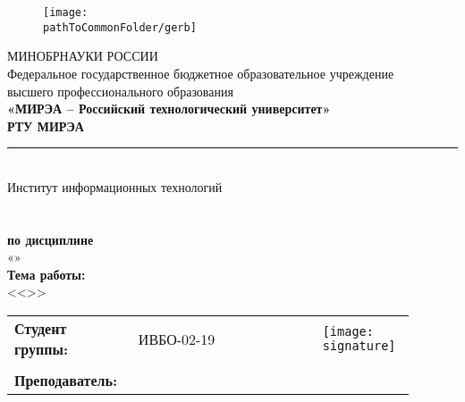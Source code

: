 
\begin{center}
	\begin{figure}[h!]
		\begin{center}
		\texttt{[image: \\pathToCommonFolder/gerb]}
		\end{center}	
	\end{figure}
 	\small	МИНОБРНАУКИ РОССИИ \\
	Федеральное государственное бюджетное образовательное учреждение\\
						высшего профессионального образования\\
\normalsize					
\textbf{«МИРЭА – Российский технологический университет»\\
						РТУ МИРЭА}\\
						\noindent\rule{1\linewidth}{2pt}\\
       Институт информационных технологий\\ %
					\kafedra\\
		\vspace{3ex}
			\large \textbf{\workname}  \\
						\textbf{по дисциплине}\\ «\discipline» \\
		\vspace{3ex}
		\if \withouttheme
			\textbf{Тема работы:}\\ <<\theme>>
		\fi
\vspace{3ex}
\small
\begin{table}[h!]
\begin{tabular}{p{0.26\linewidth}p{0.25\linewidth}p{0.18\linewidth}p{0.2\linewidth}}
	\textbf{Студент группы:} &  ИВБО-02-19 &\studentfio &\texttt{[image: \\signature]}  \\\\
	\textbf{Преподаватель:} & \rang &\teacherfio &  \\
\end{tabular}
\end{table}
\end{center}

